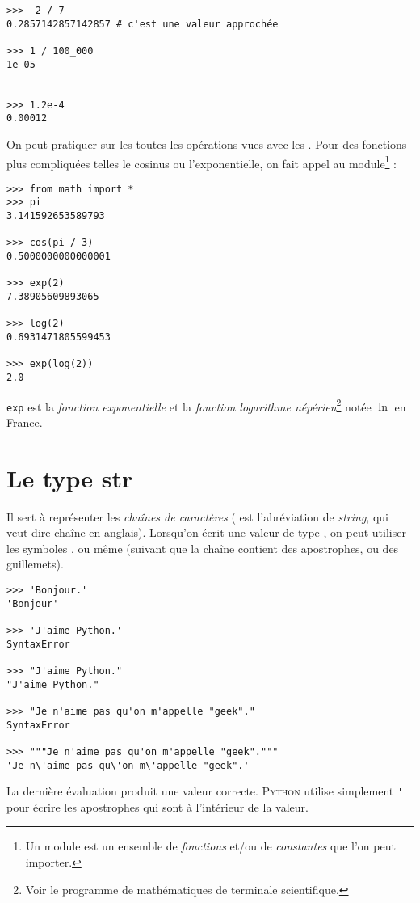 \begin{pys}\begin{verbatim}
>>>  2 / 7
0.2857142857142857 # c'est une valeur approchée

>>> 1 / 100_000
1e-05


>>> 1.2e-4
0.00012
\end{verbatim}
\end{pys}

On peut pratiquer sur les  toutes les opérations vues avec les . Pour des fonctions plus compliquées telles le cosinus ou
l'exponentielle, on fait appel au module\footnote{Un module est un ensemble de \textit{fonctions} et/ou de \textit{constantes} que l'on peut importer.}
 :

\begin{pys}\begin{verbatim}
>>> from math import *
>>> pi
3.141592653589793

>>> cos(pi / 3)
0.5000000000000001

>>> exp(2)
7.38905609893065

>>> log(2)
0.6931471805599453

>>> exp(log(2))
2.0
\end{verbatim}
\end{pys}

\texttt{exp} est la \textit{fonction exponentielle} et  la \textit{fonction logarithme népérien}\footnote{Voir le programme de mathématiques
    de terminale scientifique.} notée $\ln$ en France.



\section{Le type str}

Il sert à représenter les \textit{chaînes de caractères} ( est l'abréviation de \textit{string}, qui veut dire chaîne en anglais).
Lorsqu'on écrit une valeur de type , on peut utiliser les symboles ,  ou même  (suivant que la chaîne contient des apostrophes, ou des guillemets).

\begin{pys}\begin{verbatim}
>>> 'Bonjour.'
'Bonjour'

>>> 'J'aime Python.'
SyntaxError

>>> "J'aime Python."
"J'aime Python."

>>> "Je n'aime pas qu'on m'appelle "geek"."
SyntaxError

>>> """Je n'aime pas qu'on m'appelle "geek"."""
'Je n\'aime pas qu\'on m\'appelle "geek".'
\end{verbatim}
\end{pys}
La dernière évaluation produit une valeur correcte. \textsc{Python} utilise simplement \texttt{\'} pour écrire les apostrophes qui sont à l'intérieur de la valeur.\\


